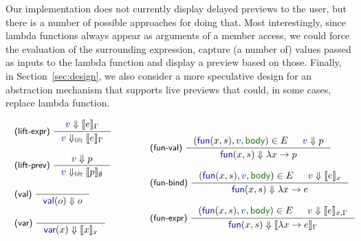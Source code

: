 \documentclass[acmsmall,anonymous,fleqn]{acmart}\settopmatter{printfolios=false,printccs=false,printacmref=false}
\theoremstyle{plain}
\theoremstyle{definition}
\newcommand{\ident}[1]{\textnormal{\textcolor{idclr}{\sffamily #1}}}
\newcommand{\bndclr}[1]{\textcolor{kvdclr}{#1}}
\newcommand{\bnd}[1]{\textnormal{\textcolor{kvdclr}{\sffamily #1}}}
\newcommand{\blbl}[1]{\textnormal{\textcolor{numclr}{\sffamily #1}}}
\newcommand{\rname}[1]{{\sffamily\small(#1)}}
\begin{document}
Our implementation does not currently display
delayed previews to the user, but there is a number of possible approaches for doing that.
Most interestingly, since lambda functions always appear as arguments of a member access, we could
force the evaluation of the surrounding expression, capture (a number of) values passed as inputs
to the lambda function and display a preview based on those. Finally, in Section~\ref{sec:design},
we also consider a more speculative design for an abstraction mechanism that supports live previews
that could, in some cases, replace lambda function.


\begin{figure}[b]
\begin{equation*}
\hspace{-2.5em}
\begin{array}{l}
\inference[\rname{lift-expr}~]
  {\bndclr{v} \Downarrow \llbracket e \rrbracket_\Gamma}
  {\bndclr{v} \Downarrow_{\ident{lift}} \llbracket e \rrbracket_\Gamma}
\\
\\
\inference[\rname{lift-prev}~]
  {\bndclr{v} \Downarrow p}
  {\bndclr{v} \Downarrow_{\ident{lift}} \llbracket p \rrbracket_\emptyset}
\\
\\
\inference[\rname{val}~]
  {~}
  {\bnd{val}(o) \Downarrow o }
\\
\\
\inference[\rname{var}~]
  {~}
  {\bnd{var}(x) \Downarrow \llbracket x \rrbracket_x}
  \\[0.5em]~
\end{array}
\qquad\quad
\begin{array}{l}
\inference[\rname{fun-val}~]
  { (\bnd{fun}(x, s), \bndclr{v}, \blbl{body}) \in E & \bndclr{v} \Downarrow p }
  { \bnd{fun}(x, s) \Downarrow \lambda x\rightarrow p }
\\
\\
\inference[\rname{fun-bind}~]
  { (\bnd{fun}(x, s), \bndclr{v}, \blbl{body}) \in E & \bndclr{v} \Downarrow \llbracket e \rrbracket_{x} }
  { \bnd{fun}(x, s) \Downarrow \lambda x\rightarrow e }
\\
\\
\inference[\rname{fun-expr}~]
  { (\bnd{fun}(x, s), \bndclr{v}, \blbl{body}) \in E & \bndclr{v} \Downarrow \llbracket e \rrbracket_{x,\Gamma} }
  { \bnd{fun}(x, s) \Downarrow \llbracket \lambda x\rightarrow e \rrbracket_\Gamma }

\end{array}
\end{equation*}
\end{figure}
\end{document}
